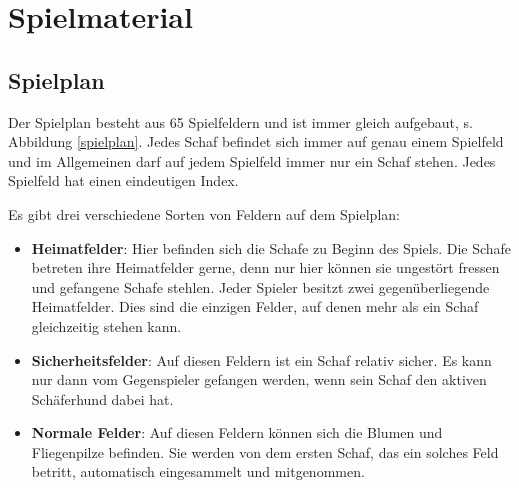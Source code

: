 \documentclass[11pt,pointlessnumbers,DIV10,BCOR10mm,tocleft]{scrreprt}
\begin{document}
\section{Spielmaterial}
\subsection{Spielplan}
Der Spielplan besteht aus 65 Spielfeldern und ist immer gleich aufgebaut, s. Abbildung \ref{spielplan}. Jedes Schaf befindet sich immer auf genau einem Spielfeld und im Allgemeinen darf auf jedem Spielfeld immer nur ein Schaf stehen. Jedes Spielfeld hat einen eindeutigen Index.

Es gibt drei verschiedene Sorten von Feldern auf dem Spielplan:

\begin{itemize}
\item \textbf{Heimatfelder}: Hier befinden sich die Schafe zu Beginn des Spiels. Die Schafe betreten ihre Heimatfelder gerne, denn nur hier können sie ungestört fressen und gefangene Schafe stehlen. Jeder Spieler besitzt zwei gegenüberliegende Heimatfelder. Dies sind die einzigen Felder, auf denen mehr als ein Schaf gleichzeitig stehen kann.

\item \textbf{Sicherheitsfelder}: Auf diesen Feldern ist ein Schaf relativ sicher. Es kann nur dann vom Gegenspieler gefangen werden, wenn sein Schaf den aktiven Schäferhund dabei hat.

\item \textbf{Normale Felder}: Auf diesen Feldern können sich die Blumen und Fliegenpilze befinden. Sie werden von dem ersten Schaf, das ein solches Feld betritt, automatisch eingesammelt und mitgenommen.
\end{itemize}
\end{document}
